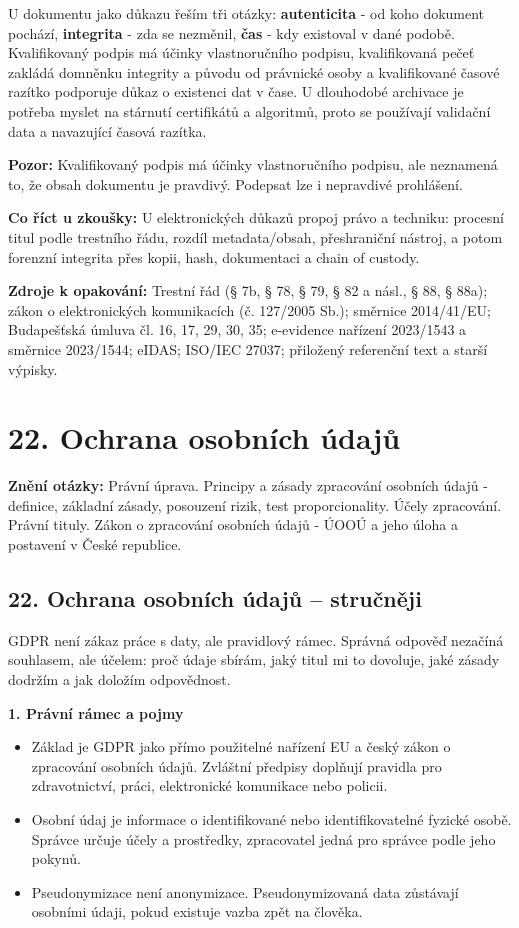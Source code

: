 \documentclass[11pt,a4paper]{article}
\newcommand{\otazka}[3]{\section*{#1}\addcontentsline{toc}{section}{#1}\noindent\textbf{Znění otázky:} #2\par\medskip}
\newcommand{\zkouska}[1]{\begin{tcolorbox}[breakable,enhanced,colback=blue!7,colframe=blue!30!black,boxrule=0pt,arc=1mm,left=5pt,right=5pt,top=5pt,bottom=5pt,before skip=6pt,after skip=6pt]\textbf{Co říct u zkoušky:} #1\end{tcolorbox}}
\newcommand{\pozor}[1]{\begin{tcolorbox}[breakable,enhanced,colback=red!7,colframe=red!30!black,boxrule=0pt,arc=1mm,left=5pt,right=5pt,top=5pt,bottom=5pt,before skip=6pt,after skip=6pt]\textbf{Pozor:} #1\end{tcolorbox}}
\newcommand{\zdroje}[1]{\medskip\noindent\textbf{Zdroje k opakování:} #1\medskip}
\begin{document}
U dokumentu jako důkazu řeším tři otázky: \textbf{autenticita} - od koho dokument pochází, \textbf{integrita} - zda se nezměnil, \textbf{čas} - kdy existoval v dané podobě. Kvalifikovaný podpis má účinky vlastnoručního podpisu, kvalifikovaná pečeť zakládá domněnku integrity a původu od právnické osoby a kvalifikované časové razítko podporuje důkaz o existenci dat v čase. U dlouhodobé archivace je potřeba myslet na stárnutí certifikátů a algoritmů, proto se používají validační data a navazující časová razítka.

\pozor{Kvalifikovaný podpis má účinky vlastnoručního podpisu, ale neznamená to, že obsah dokumentu je pravdivý. Podepsat lze i nepravdivé prohlášení.}

\zkouska{U elektronických důkazů propoj právo a techniku: procesní titul podle trestního řádu, rozdíl metadata/obsah, přeshraniční nástroj, a potom forenzní integrita přes kopii, hash, dokumentaci a chain of custody.}

\zdroje{Trestní řád (§ 7b, § 78, § 79, § 82 a násl., § 88, § 88a); zákon o elektronických komunikacích (č. 127/2005 Sb.); směrnice 2014/41/EU; Budapešťská úmluva čl. 16, 17, 29, 30, 35; e-evidence nařízení 2023/1543 a směrnice 2023/1544; eIDAS; ISO/IEC 27037; přiložený referenční text a starší výpisky.}

\fi

\newpage

\otazka{22. Ochrana osobních údajů}{Právní úprava. Principy a zásady zpracování osobních údajů - definice, základní zásady, posouzení rizik, test proporcionality. Účely zpracování. Právní tituly. Zákon o zpracování osobních údajů - ÚOOÚ a jeho úloha a postavení v České republice.}{BI301K}

\subsection*{22. Ochrana osobních údajů -- stručněji}
GDPR není zákaz práce s daty, ale pravidlový rámec. Správná odpověď nezačíná souhlasem, ale účelem: proč údaje sbírám, jaký titul mi to dovoluje, jaké zásady dodržím a jak doložím odpovědnost.

\textbf{1. Právní rámec a pojmy}
\begin{itemize}
  \item Základ je GDPR jako přímo použitelné nařízení EU a český zákon o zpracování osobních údajů. Zvláštní předpisy doplňují pravidla pro zdravotnictví, práci, elektronické komunikace nebo policii.
  \item Osobní údaj je informace o identifikované nebo identifikovatelné fyzické osobě. Správce určuje účely a prostředky, zpracovatel jedná pro správce podle jeho pokynů.
  \item Pseudonymizace není anonymizace. Pseudonymizovaná data zůstávají osobními údaji, pokud existuje vazba zpět na člověka.
\end{itemize}
\end{document}
